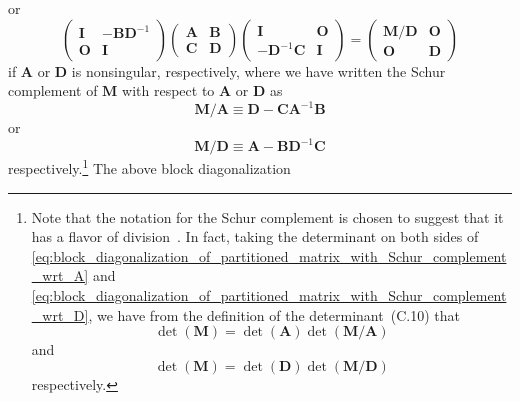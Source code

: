 \documentclass[12pt,a4paper]{article}
\begin{document}
or
\begin{equation}
\begin{pmatrix}
\mathbf{I} & -\mathbf{B}\mathbf{D}^{-1} \\
\mathbf{O} & \mathbf{I}
\end{pmatrix}
\begin{pmatrix}
\mathbf{A} & \mathbf{B} \\
\mathbf{C} & \mathbf{D}
\end{pmatrix}
\begin{pmatrix}
\mathbf{I} & \mathbf{O} \\
-\mathbf{D}^{-1}\mathbf{C} & \mathbf{I}
\end{pmatrix}
=
\begin{pmatrix}
\mathbf{M}/\mathbf{D} & \mathbf{O} \\
\mathbf{O} & \mathbf{D}
\end{pmatrix}
\label{eq:block_diagonalization_of_partitioned_matrix_with_Schur_complement_wrt_D}
\end{equation}
if $\mathbf{A}$ or $\mathbf{D}$ is nonsingular, respectively,
where we have written the Schur complement of $\mathbf{M}$ with respect to
$\mathbf{A}$ or $\mathbf{D}$ as
\begin{equation}
\mathbf{M}/\mathbf{A} \equiv \mathbf{D} - \mathbf{C}\mathbf{A}^{-1}\mathbf{B}
\label{eq:Schur_complement_of_M_wrt_A}
\end{equation}
or
\begin{equation}
\mathbf{M}/\mathbf{D} \equiv \mathbf{A} - \mathbf{B}\mathbf{D}^{-1}\mathbf{C}
\label{eq:Schur_complement_of_M_wrt_D}
\end{equation}
respectively.\footnote{%
Note that the notation for the Schur complement is chosen to suggest that
it has a flavor of division~\citep{Minka:OldNewMatrixAlgebra}.
In fact, taking the determinant on both sides of
\eqref{eq:block_diagonalization_of_partitioned_matrix_with_Schur_complement_wrt_A} and
\eqref{eq:block_diagonalization_of_partitioned_matrix_with_Schur_complement_wrt_D},
we have from the definition of the determinant~(C.10) that
\begin{equation}
\operatorname{det}(\mathbf{M}) =
\operatorname{det}(\mathbf{A}) \operatorname{det}(\mathbf{M}/\mathbf{A})
\end{equation}
and
\begin{equation}
\operatorname{det}(\mathbf{M}) =
\operatorname{det}(\mathbf{D}) \operatorname{det}(\mathbf{M}/\mathbf{D})
\end{equation}
respectively.}
The above block diagonalization
\end{document}
